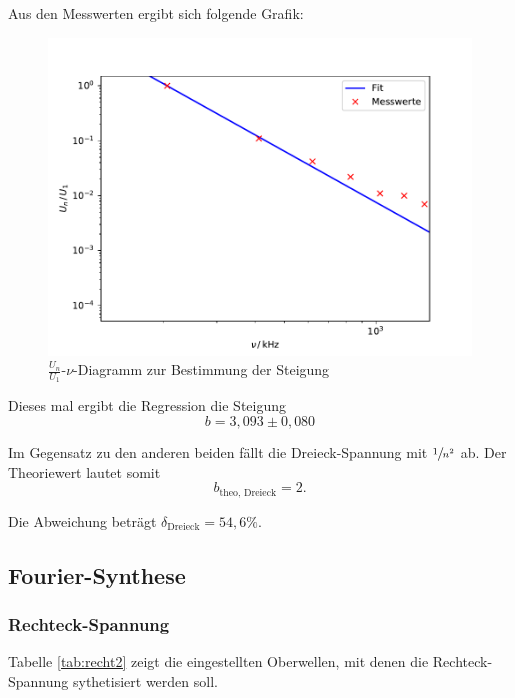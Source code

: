 Aus den Messwerten ergibt sich folgende Grafik:

\begin{figure}[H]
  \centering
  \includegraphics[width=\textwidth]{Plots/drei.pdf}
  \caption{$\frac{U_n}{U_1}$-$\nu$-Diagramm zur Bestimmung der Steigung}
  \label{fig:drei}
\end{figure}

Dieses mal ergibt die Regression die Steigung
\begin{equation*}
  b = 3,093 \pm 0,080
\end{equation*}

Im Gegensatz zu den anderen beiden fällt die Dreieck-Spannung mit $\sfrac{1}{n^2}$ ab.
Der Theoriewert lautet somit
\begin{equation*}
  b_\text{theo, Dreieck} = 2.
\end{equation*}

Die Abweichung beträgt $\delta_\text{Dreieck} = 54,6 \%$.

\subsection{Fourier-Synthese}

\subsubsection{Rechteck-Spannung}

Tabelle \ref{tab:recht2} zeigt die eingestellten Oberwellen, mit denen die Rechteck-Spannung sythetisiert werden soll.

